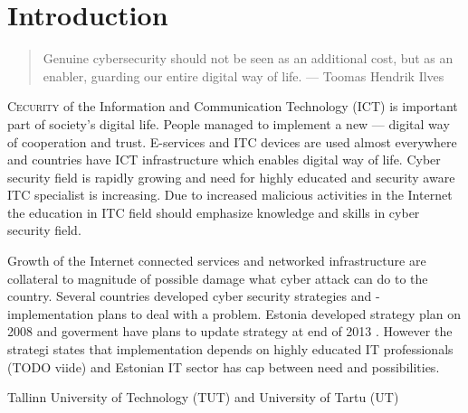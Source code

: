 \chapter{Introduction}
\label{Introduction}

 
\begin{quote}
Genuine cybersecurity should not be seen as an additional cost, but as an enabler, guarding our entire digital way of life. --- Toomas Hendrik Ilves
\end{quote}

\lettrine[lraise=0.1, nindent=0em, slope=-.5em]{\color{Violet}C}{ecurity} of the Information and Communication Technology (\gls{ICT}) is important part of society's digital life. People managed to implement a new --- digital way of cooperation and trust. E-services and ITC devices are used almost everywhere and countries have \gls{ICT} infrastructure which enables digital way of life.
Cyber security field is rapidly growing and need for highly educated and security aware ITC specialist is increasing. Due to increased malicious activities in the Internet the education in ITC field should emphasize knowledge and skills in cyber security field.

Growth of the Internet connected services and networked infrastructure are collateral to magnitude of possible damage what cyber attack can do to the country. Several countries developed cyber security strategies and -implementation plans to deal with a problem.
Estonia developed strategy plan on 2008 \citep{Strategy2008} and goverment have plans to update strategy at end of 2013 \citep{StrategyProposal2013}. However the strategi states that implementation depends on highly educated IT professionals (TODO viide) and Estonian IT sector has cap between need and possibilities.

Tallinn University of Technology (\gls{TUT}) and University of Tartu (\gls{UT})

